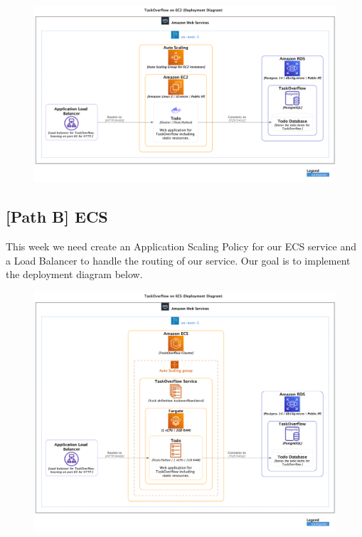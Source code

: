 \documentclass{csse4400}
\begin{document}


\begin{figure}[H]
  \includegraphics[width=\textwidth]{diagrams/ec2deployment}
\end{figure}

\subsection{[Path B] ECS}
\label{pathb}

This week we need create an Application Scaling Policy for our ECS service
and a Load Balancer to handle the routing of our service.
Our goal is to implement the deployment diagram below.

\begin{figure}[H]
  \includegraphics[width=\textwidth]{diagrams/ecsdeployment}
\end{figure}
\end{document}
